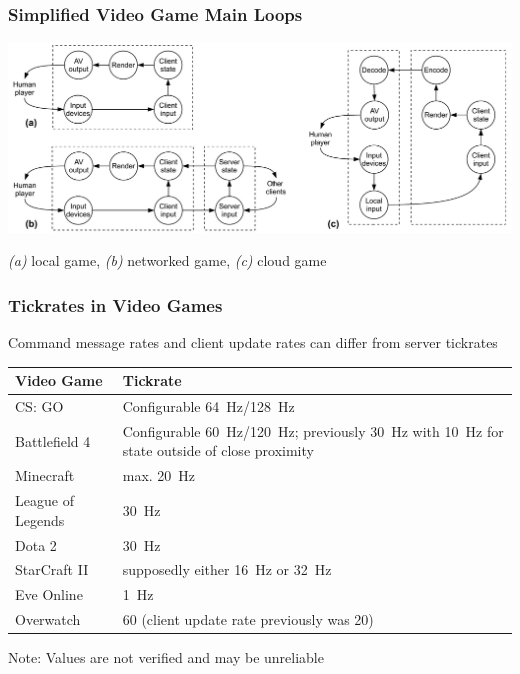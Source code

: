 \documentclass{UDEbeamerEN}
\begin{document}
\begin{frame}
	\frametitle{Simplified Video Game Main Loops}

	\begin{center}

		\includegraphics[width=\textwidth]{../../../models/component_interaction_full.pdf}

		{\small \textit{(a)} local game, \textit{(b)} networked game, \textit{(c)} cloud game}
	\end{center}

\end{frame}


\begin{frame}
	\frametitle{Tickrates in Video Games}

	\begin{center}
	Command message rates and client update rates can differ from server tickrates
	{\small
		\begin{tabu}{X[0.45]X}
			\toprule
			\textbf{Video Game} & \textbf{Tickrate} \\
			\midrule
			CS: GO & Configurable \SI{64}{\hertz}/\SI{128}{\hertz} \\
			Battlefield 4 & Configurable \SI{60}{\hertz}/\SI{120}{\hertz}; previously \SI{30}{\hertz} with \SI{10}{\hertz} for state outside of close proximity  \\
			Minecraft & max. \SI{20}{\hertz} \\
			League of Legends & \SI{30}{\hertz} \\
			Dota 2 & \SI{30}{\hertz} \\
			StarCraft II & supposedly either \SI{16}{\hertz} or \SI{32}{\hertz} \\
			Eve Online & \SI{1}{\hertz} \\
			Overwatch & 60 (client update rate previously was 20) \\
			\bottomrule
		\end{tabu}}

	Note: Values are not verified and may be unreliable

	\end{center}

\end{frame}
\end{document}
